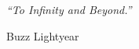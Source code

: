 \null\vfill
\textit{``To Infinity and Beyond.''}

\begin{flushright}
Buzz Lightyear
\end{flushright}

\vfill\vfill\vfill\vfill\vfill\vfill\null
